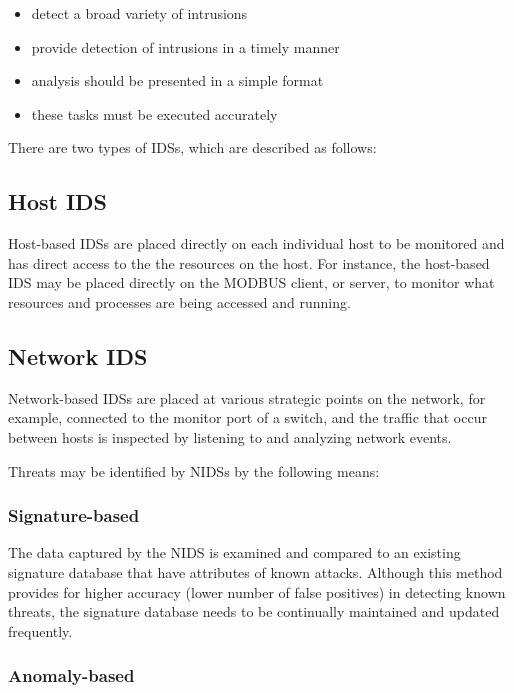 \documentclass[11pt,]{article}
\begin{document}
\begin{itemize}
\itemsep1pt\parskip0pt
\item
  detect a broad variety of intrusions
\item
  provide detection of intrusions in a timely manner
\item
  analysis should be presented in a simple format
\item
  these tasks must be executed accurately
\end{itemize}

There are two types of IDSs, which are described as follows:

\subsection{Host IDS}\label{host-ids}

Host-based IDSs are placed directly on each individual host to be
monitored and has direct access to the the resources on the host. For
instance, the host-based IDS may be placed directly on the MODBUS
client, or server, to monitor what resources and processes are being
accessed and running.

\subsection{Network IDS}\label{network-ids}

Network-based IDSs are placed at various strategic points on the
network, for example, connected to the monitor port of a switch, and the
traffic that occur between hosts is inspected by listening to and
analyzing network events.

Threats may be identified by NIDSs by the following means:

\subsubsection{Signature-based}\label{signature-based}

The data captured by the NIDS is examined and compared to an existing
signature database that have attributes of known attacks. Although this
method provides for higher accuracy (lower number of false positives) in
detecting known threats, the signature database needs to be continually
maintained and updated frequently.

\subsubsection{Anomaly-based}\label{anomaly-based}
\end{document}
